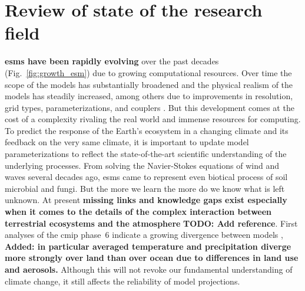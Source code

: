 \section{Review of state of the research field}
\label{sec:review}


\textbf{\glspl{esm} have been rapidly evolving} over the past decades (Fig.~\ref{fig:growth_esm}) due to growing computational resources. Over time the scope of the models has substantially broadened and the physical realism of the models has steadily increased, among others due to improvements in resolution, grid types, parameterizations, and couplers \parencite{AMS:Randall2018}. But this development comes at the cost of a complexity rivaling the real world and immense resources for computing. To predict the response of the Earth’s ecosystem in a changing climate and its feedback on the very same climate, it is important to update model parameterizations to reflect the state-of-the-art scientific understanding of the underlying processes. From solving the Navier-Stokes equations of wind and waves several decades ago, \glspl{esm} came to represent even biotical process of soil microbial and fungi. But the more we learn the more do we know what is left unknown. At present \textbf{missing links and knowledge gaps exist especially when it comes to the details of the complex interaction between terrestrial ecosystems and the atmosphere} \textbf{\color{red}TODO: Add reference}. First analyses of the \gls{cmip} phase~6 indicate a growing divergence between models \parencite{ESD:Tebaldi2021}, \textbf{\color{blue}Added: in particular averaged temperature and precipitation diverge more strongly over land than over ocean due to differences in land use and aerosols.} Although this will not revoke our fundamental understanding of climate change, it still affects the reliability of model projections.\\

